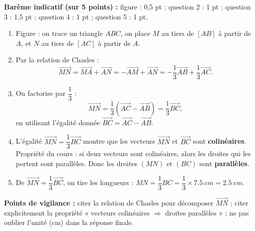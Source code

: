 \documentclass[11pt]{article}
\begin{document}
\begin{corrige}
\textbf{Barème indicatif (sur 5 points) :} figure : 0,5 pt ; question 2 : 1 pt ; question 3 : 1,5 pt ; question 4 : 1 pt ; question 5 : 1 pt.
\begin{enumerate}
\item Figure : on trace un triangle $ABC$, on place $M$ au tiers de $[AB]$ à partir de $A$, et $N$ au tiers de $[AC]$ à partir de $A$.
\item Par la relation de Chasles :
\[ \overrightarrow{MN} = \overrightarrow{MA} + \overrightarrow{AN} = -\overrightarrow{AM} + \overrightarrow{AN} = -\dfrac{1}{3}\overrightarrow{AB} + \dfrac{1}{3}\overrightarrow{AC}. \]
\item On factorise par $\dfrac{1}{3}$ :
\[ \overrightarrow{MN} = \dfrac{1}{3}\left(\overrightarrow{AC} - \overrightarrow{AB}\right) = \dfrac{1}{3}\overrightarrow{BC}, \]
en utilisant l'égalité donnée $\overrightarrow{BC} = \overrightarrow{AC} - \overrightarrow{AB}$.
\item L'égalité $\overrightarrow{MN} = \dfrac{1}{3}\overrightarrow{BC}$ montre que les vecteurs $\overrightarrow{MN}$ et $\overrightarrow{BC}$ sont \textbf{colinéaires}. Propriété du cours : si deux vecteurs sont colinéaires, alors les droites qui les portent sont parallèles. Donc les droites $(MN)$ et $(BC)$ sont \textbf{parallèles}.
\item De $\overrightarrow{MN} = \dfrac{1}{3}\overrightarrow{BC}$, on tire les longueurs : $MN = \dfrac{1}{3}BC = \dfrac{1}{3}\times \SI{7,5}{cm} = \SI{2,5}{cm}$.
\end{enumerate}
\textbf{Points de vigilance :} citer la relation de Chasles pour décomposer $\overrightarrow{MN}$ ; citer explicitement la propriété « vecteurs colinéaires $\Rightarrow$ droites parallèles » ; ne pas oublier l'unité (cm) dans la réponse finale.
\end{corrige}
\end{document}
